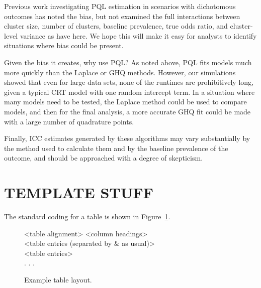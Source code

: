 \documentclass[Afour,times,sagev,doublespace]{sagej}
\begin{document}
Previous work investigating PQL estimation in scenarios with dichotomous outcomes has noted the bias\cite{jang_numerical_2009,zhang_fitting_2011}, but not examined the full interactions between cluster size, number of clusters, baseline prevalence, true odds ratio, and cluster-level variance as have here. We hope this will make it easy for analysts to identify situations where bias could be present.

Given the bias it creates, why use PQL? As noted above, PQL fits models much more quickly than the Laplace or GHQ methods. However, our simulations showed that even for large data sets, none of the runtimes are prohibitively long, given a typical CRT model with one random intercept term. In a situation where many models need to be tested, the Laplace method could be used to compare models, and then for the final analysis, a more accurate GHQ fit could be made with a large number of quadrature points.

Finally, ICC estimates generated by these algorithms may vary substantially by the method used to calculate them and by the baseline prevalence of the outcome, and should be approached with a degree of skepticism.





\section{TEMPLATE STUFF}


The standard coding for a table is shown in Figure~\ref{F2}.

\begin{figure}
\setlength{\fboxsep}{0pt}%
\setlength{\fboxrule}{0pt}%
\begin{center}
\begin{boxedverbatim}
\begin{table}
\small\sf\centering
\caption{<Table caption.>}
\begin{tabular}{<table alignment>}
\toprule
<column headings>\\
\midrule
<table entries
(separated by & as usual)>\\
<table entries>\\
.
.
.\\
\bottomrule
\end{tabular}
\end{table}
\end{boxedverbatim}
\end{center}
\caption{Example table layout.\label{F2}}
\end{figure}
\end{document}
